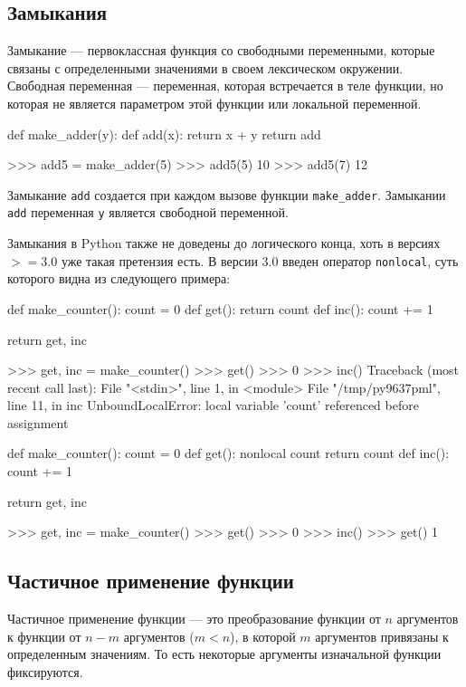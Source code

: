 \subsection{Замыкания}
Замыкание --- первоклассная функция со свободными переменными, которые связаны с определенными значениями в своем лексическом окружении. Свободная переменная --- переменная, которая встречается в теле функции, но которая не является параметром этой функции или локальной переменной.
\begin{pylst}{}{}
def make_adder(y):
    def add(x):
        return x + y
    return add

>>> add5 = make_adder(5)
>>> add5(5)
10
>>> add5(7)
12
\end{pylst}

Замыкание \lstinline{add} создается при каждом вызове функции \lstinline{make_adder}. Замыкании \lstinline{add} переменная \lstinline{y} является свободной переменной.

Замыкания в Python также не доведены до логического конца, хоть в версиях $>=3.0$ уже такая претензия есть. В версии 3.0 введен оператор \lstinline{nonlocal}, суть которого видна из следующего примера:
\begin{pylst}{}{}
def make_counter():
    count = 0
    def get():
        return count
    def inc():
        count += 1

    return get, inc

>>> get, inc = make_counter()
>>> get()
>>> 0
>>> inc()
Traceback (most recent call last):
  File "<stdin>", line 1, in <module>
  File "/tmp/py9637pml", line 11, in inc
UnboundLocalError: local variable 'count' referenced before assignment

def make_counter():
    count = 0
    def get():
        nonlocal count
        return count
    def inc():
        count += 1

    return get, inc

>>> get, inc = make_counter()
>>> get()
>>> 0
>>> inc()
>>> get()
1
\end{pylst}

\subsection{Частичное применение функции}
Частичное применение функции --- это преобразование функции от $n$ аргументов к функции от $n - m$ аргументов ($m < n$), в которой $m$ аргументов привязаны к определенным значениям. То есть некоторые аргументы изначальной функции фиксируются.

